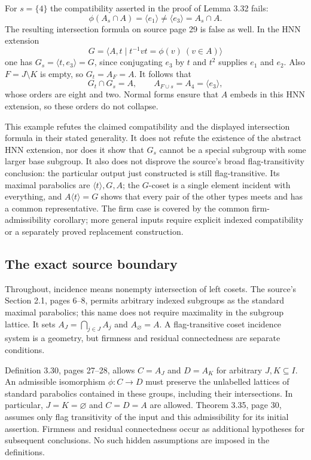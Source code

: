 For $s=\{4\}$ the compatibility asserted in the proof of Lemma 3.32
fails:
\[
 \phi(A_s\cap A)=\langle e_1\rangle
 \ne\langle e_3\rangle=A_s\cap A.
\]
The resulting intersection formula on source page 29 is false as well.
In the HNN extension
\[
 G=\langle A,t\mid t^{-1}vt=\phi(v)\ (v\in A)\rangle
\]
one has $G_s=\langle t,e_3\rangle=G$, since conjugating $e_3$ by
$t$ and $t^2$ supplies $e_1$ and $e_2$. Also $F=J\setminus K$ is
empty, so $G_t=A_F=A$. It follows that
\[
 G_t\cap G_s=A,\qquad A_{F\cup s}=A_4=\langle e_3\rangle,
\]
whose orders are eight and two. Normal forms ensure that $A$ embeds
in this HNN extension, so these orders do not collapse.

This example refutes the claimed compatibility and the displayed
intersection formula in their stated generality. It does not refute
the existence of the abstract HNN extension, nor does it show that
$G_s$ cannot be a special subgroup with some larger base subgroup.
It also does not disprove the source's broad flag-transitivity conclusion:
the particular output just constructed is still flag-transitive. Its
maximal parabolics are $\langle t\rangle,G,A$; the $G$-coset is a
single element incident with everything, and $A\langle t\rangle=G$
shows that every pair of the other types meets and has a common
representative.
The firm case is covered by the common firm-admissibility corollary; more general
inputs require explicit indexed compatibility or a separately proved
replacement construction.


\subsection{The exact source boundary}
Throughout, incidence means nonempty intersection of left cosets. The
source's Section 2.1, pages 6--8, permits arbitrary indexed subgroups as
the standard maximal parabolics; this name does not require maximality in
the subgroup lattice. It sets $A_J=\bigcap_{j\in J}A_j$ and
$A_\varnothing=A$. A flag-transitive coset incidence system is a geometry,
but firmness and residual connectedness are separate conditions.

Definition 3.30, pages 27--28, allows $C=A_J$ and $D=A_K$ for arbitrary
$J,K\subseteq I$. An admissible isomorphism $\phi:C\to D$ must preserve
the unlabelled lattices of standard parabolics contained in these groups,
including their intersections. In particular, $J=K=\varnothing$ and
$C=D=A$ are allowed. Theorem 3.35, page 30, assumes only flag transitivity
of the input and this admissibility for its initial assertion. Firmness
and residual connectedness occur as additional hypotheses for subsequent
conclusions. No such hidden assumptions are imposed in the definitions.

